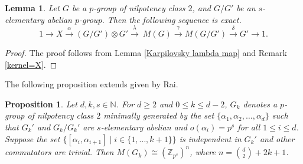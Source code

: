 \documentclass[preprint,sort&compress,12pt]{elsarticle}
\newtheorem{lemma}[theorem]{Lemma}
\newtheorem{proposition}[theorem]{Proposition}
\numberwithin{equation}{section}
\theoremstyle{definition}
\newcommand{\Z}{\mathbb{Z}}
\begin{document}
\begin{lemma} 
     Let $G$ be a $p$-group of nilpotency class $2$, and $G/G'$ be an $s$-elementary abelian $p$-group. Then the following sequence is exact.
     \begin{equation} \label{exactseq X}
        1 \to X \xrightarrow{\alpha} (G/G') \otimes G' \xrightarrow{\lambda}\ M(G) \xrightarrow{\gamma} M(G/G') \xrightarrow{\delta} G' \to 1. 
     \end{equation} 
\end{lemma} 
\begin{proof}
  The proof follows from Lemma \ref{Karpilovsky lambda map} and Remark \ref{kernel=X}.
\end{proof}

The following proposition extends \cite[Proposition 10]{Rai2023} given by Rai.

\begin{proposition} \label{Schurspecial}
Let $d,k, s \in \mathbb N$. For  $d \ge 2$ and $0 \le k \le d-2$,  $G_k$ denotes a $p$-group of nilpotency class $2$  minimally generated by the set 
$\{\alpha_1,\alpha_2,\ldots,\alpha_d\}$ such that $G_k'$ and $G_k/G_k'$ are $s$-elementary abelian and $o(\alpha_i)=p^s$ for all ${1 \le i \le d}$.  Suppose the set 
   ${\{[\alpha_i,\alpha_{i+1}] \mid i \in \{1,\ldots,  k+1\} \}}$ is independent in $G_k'$ and other commutators are trivial. Then  $M(G_k)\cong (\Z_{p^s})^n$, where ${n=\binom{d}{2}+2k+1}$.
\end{proposition} 
\end{document}

